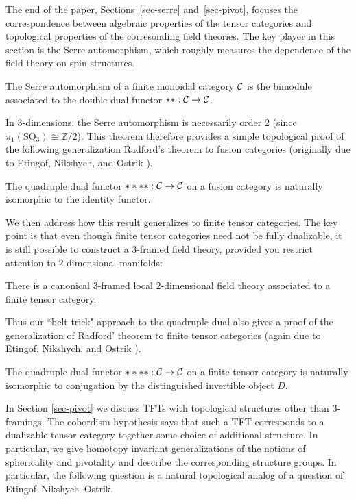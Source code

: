 \documentclass{amsart}
\begin{document}
The end of the paper, Sections~\ref{sec-serre} and~\ref{sec-pivot}, focuses the correspondence between algebraic properties of the tensor categories and topological properties of the corresonding field theories.  The key player in this section is the Serre automorphism, which roughly measures the dependence of the field theory on spin structures.

\begin{theorem}
The Serre automorphism of a finite monoidal category $\mathcal C$ is the bimodule associated to the double dual functor $**: \mathcal C \rightarrow \mathcal C$.   
\end{theorem}

In $3$-dimensions, the Serre automorphism is necessarily order 2 (since $\pi_1(\mathrm{SO}_3) \cong \mathbb{Z}/2$). This theorem therefore provides a simple topological proof of the following generalization Radford's theorem \cite{MR0407069} to fusion categories (originally due to Etingof, Nikshych, and Ostrik \cite{MR2183279}).
\begin{corollary}
The quadruple dual functor $****: \mathcal C \rightarrow \mathcal C$ on a fusion category is naturally isomorphic to the identity functor.
\end{corollary}

We then address how this result generalizes to finite tensor categories.  The key point is that even though finite tensor categories need not be fully dualizable, it is still possible to construct a $3$-framed field theory, provided you restrict attention to $2$-dimensional manifolds:

\begin{theorem}
There is a canonical $3$-framed local $2$-dimensional field theory associated to a finite tensor category.
\end{theorem}

Thus our ``belt trick" approach to the quadruple dual also gives a proof of the generalization of Radford' theorem to finite tensor categories (again due to Etingof, Nikshych, and Ostrik \cite{MR2097289}).

\begin{corollary}
The quadruple dual functor $****: \mathcal C \rightarrow \mathcal C$ on a finite tensor category is naturally isomorphic to conjugation by the distinguished invertible object $D$.
\end{corollary}

In Section \ref{sec-pivot} we discuss TFTs with topological structures other than $3$-framings.  The cobordism hypothesis says that such a TFT corresponds to a dualizable tensor category together some choice of additional structure.  In particular, we give homotopy invariant generalizations of the notions of sphericality and pivotality and describe the corresponding structure groups.  In particular, the following question is a natural topological analog of a question of Etingof--Nikshych--Ostrik.
\end{document}
